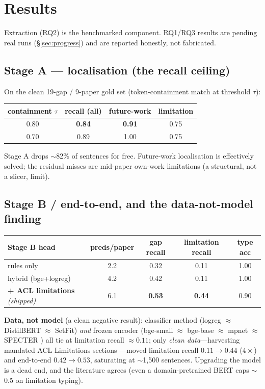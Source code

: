 \section{Results}
\label{sec:results}

Extraction (RQ2) is the benchmarked component. RQ1/RQ3 results are pending real
runs (\S\ref{sec:progress}) and are reported honestly, not fabricated.

\subsection{Stage A --- localisation (the recall ceiling)}
On the clean 19-gap / 9-paper gold set (token-containment match at threshold
$\tau$):

\begin{table}[h]
\centering
\begin{tabular}{@{}cccc@{}}
\toprule
containment $\tau$ & recall (all) & future-work & limitation \\
\midrule
$0.80$ & \textbf{0.84} & \textbf{0.91} & 0.75 \\
$0.70$ & 0.89 & 1.00 & 0.75 \\
\bottomrule
\end{tabular}
\end{table}

Stage A drops $\sim$82\% of sentences for free. Future-work localisation is
effectively solved; the residual misses are mid-paper own-work limitations
(a structural, not a slicer, limit).

\subsection{Stage B / end-to-end, and the data-not-model finding}

\begin{table}[h]
\centering
\begin{tabular}{@{}lcccc@{}}
\toprule
Stage B head & preds/paper & gap recall & limitation recall & type acc \\
\midrule
rules only & 2.2 & 0.32 & 0.11 & 1.00 \\
hybrid (bge+logreg) & 4.2 & 0.42 & 0.11 & 1.00 \\
\textbf{+ ACL limitations} \emph{(shipped)} & 6.1 & \textbf{0.53} & \textbf{0.44} & 0.90 \\
\bottomrule
\end{tabular}
\end{table}

\textbf{Data, not model} (a clean negative result): classifier method
(logreg $\approx$ DistilBERT $\approx$ SetFit) \emph{and} frozen encoder
(bge-small $\approx$ bge-base $\approx$ mpnet $\approx$ SPECTER \citep{specter})
all tie at limitation recall $\approx 0.11$; only \emph{clean data}---harvesting
mandated ACL Limitations sections \citep{limgen2024}---moved limitation recall
$0.11 \rightarrow 0.44$ ($4\times$) and end-to-end $0.42 \rightarrow 0.53$,
saturating at $\sim$1{,}500 sentences. Upgrading the model is a dead end, and the
literature agrees (even a domain-pretrained BERT caps $\sim$0.5 on limitation
typing).

